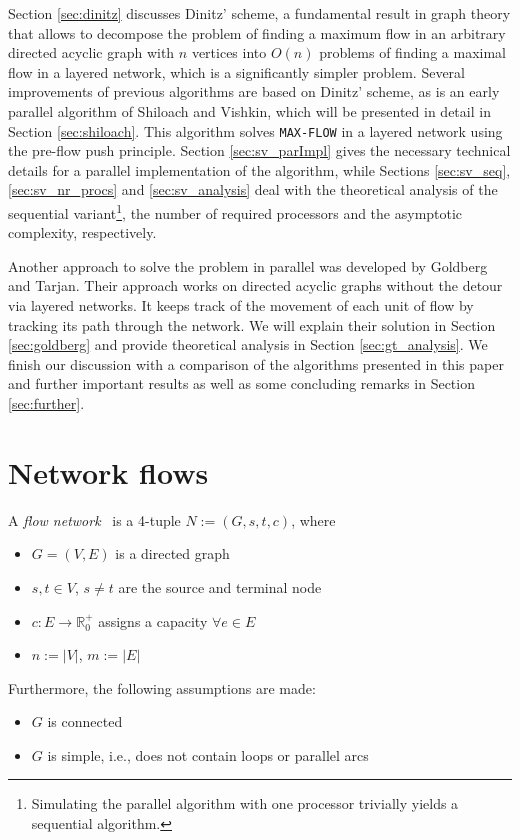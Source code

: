 \documentclass[a4paper,10pt, twocolumn]{article}
\begin{document}
Section \ref{sec:dinitz} discusses Dinitz' scheme, a fundamental result in graph theory that allows to  decompose the problem of finding a maximum flow in an arbitrary directed acyclic graph with $n$ vertices into $O(n)$ problems of finding a maximal flow in a layered network, which is a significantly simpler problem. Several improvements of previous algorithms are based on Dinitz' scheme, as is an early parallel algorithm of Shiloach and Vishkin, which will be presented in detail in  Section \ref{sec:shiloach}. This algorithm solves \lstinline|MAX-FLOW| in a layered network using the pre-flow push principle. Section \ref{sec:sv_parImpl} gives the necessary technical details for a parallel implementation of the algorithm, while Sections \ref{sec:sv_seq}, \ref{sec:sv_nr_procs} and \ref{sec:sv_analysis} deal with the theoretical analysis of the sequential variant\footnote{Simulating the parallel algorithm with one processor trivially yields a sequential algorithm.}, the number of required processors and the asymptotic complexity, respectively.

Another approach to solve the problem in parallel was developed by Goldberg and Tarjan. Their approach works on directed acyclic graphs without the detour via layered networks. It keeps track of the movement of each unit of flow by tracking its path through the network. We will explain their solution in Section \ref{sec:goldberg} and provide theoretical analysis in Section \ref{sec:gt_analysis}. We finish our discussion with a comparison of the algorithms presented in this paper and further important results as well as some concluding remarks in Section \ref{sec:further}. 

\section{Network flows}
\label{sec:networkFlows}
A \textit{flow network}~\cite{ahuja93} is a 4-tuple $N := (G,s,t,c)$, where
\begin{itemize}
	\item $G =(V,E)$ is a directed graph
    \item $s, t \in V$, $s \neq t$ are the source and terminal node
   	\item $c:E\rightarrow \mathbb{R}_0^{+}$ assigns a capacity $\forall e \in E$
   	\item $n:=\lvert V\rvert$, $m:=\lvert E\rvert$
\end{itemize}

Furthermore, the following assumptions are made:
\begin{itemize}
	\item $G$ is connected
	\item $G$ is simple, i.e., does not contain loops or parallel arcs
\end{itemize}
\end{document}
